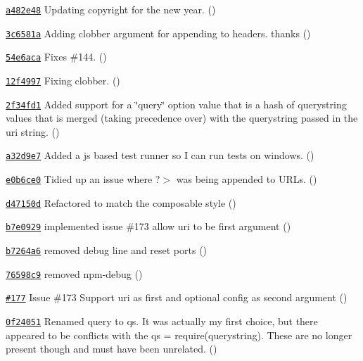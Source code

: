\begin{DoxyItemize}
\item \href{https://github.com/mikeal/request/commit/a482e4802e11fd122b12e18d1b18b49850fef823}{\tt a482e48} Updating copyright for the new year. ()
\item \href{https://github.com/mikeal/request/commit/3c6581a9d4508fe5d75e111ae0fb94c5e0078404}{\tt 3c6581a} Adding clobber argument for appending to headers. thanks  ()
\item \href{https://github.com/mikeal/request/commit/54e6aca0ab5982621fc9b35500f2154e50c0c95d}{\tt 54e6aca} Fixes \#144. ()
\item \href{https://github.com/mikeal/request/commit/12f4997ed83bfbfefa3fc5b5635bc9a6829aa0d7}{\tt 12f4997} Fixing clobber. ()
\item \href{https://github.com/mikeal/request/commit/2f34fd13b7ec86cb1c67e0a58664b9e060a34a50}{\tt 2f34fd1} Added support for a \char`\"{}query\char`\"{} option value that is a hash of querystring values that is merged (taking precedence over) with the querystring passed in the uri string. ()
\item \href{https://github.com/mikeal/request/commit/a32d9e7069533fb727a71730dbaa0f62ebefb731}{\tt a32d9e7} Added a js based test runner so I can run tests on windows. ()
\item \href{https://github.com/mikeal/request/commit/e0b6ce063de0c4223c97982128bb8203caf4a331}{\tt e0b6ce0} Tidied up an issue where ?$>$ was being appended to U\+R\+Ls. ()
\item \href{https://github.com/mikeal/request/commit/d47150d6748a452df336d8de9743218028a876db}{\tt d47150d} Refactored to match the composable style ()
\item \href{https://github.com/mikeal/request/commit/b7e0929837873a8132476bb2b4d2e2a0fdc7cd0f}{\tt b7e0929} implemented issue \#173 allow uri to be first argument ()
\item \href{https://github.com/mikeal/request/commit/b7264a6626481d5da50a28c91ea0be7b688c9daf}{\tt b7264a6} removed debug line and reset ports ()
\item \href{https://github.com/mikeal/request/commit/76598c92bee64376e5d431285ac1bf6783140dbb}{\tt 76598c9} removed npm-\/debug ()
\item \href{https://github.com/mikeal/request/pull/177}{\tt \#177} Issue \#173 Support uri as first and optional config as second argument ()
\item \href{https://github.com/mikeal/request/commit/0f240517dea65337636a49cb1cc2b5327504430e}{\tt 0f24051} Renamed query to qs. It was actually my first choice, but there appeared to be conflicts with the qs = require(\textquotesingle{}querystring\textquotesingle{}). These are no longer present though and must have been unrelated. ()

\end{DoxyItemize}
